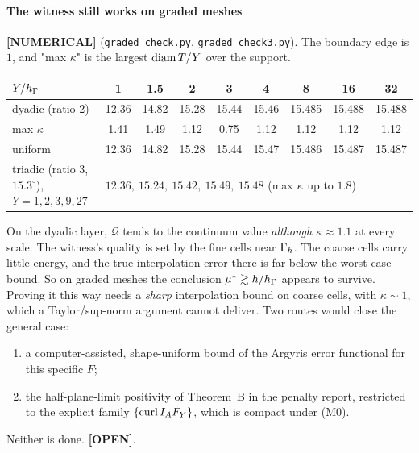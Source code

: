 \documentclass[11pt]{article}
\theoremstyle{remark}\newtheorem{remark}[theorem]{Remark}
\newcommand{\lab}[1]{\textbf{[#1]}}
\begin{document}
\paragraph{The witness still works on graded meshes} \lab{NUMERICAL} (\texttt{graded\_check.py},
\texttt{graded\_check3.py}). The boundary edge is $1$, and "max $\kappa$" is the largest $\operatorname{diam} T/Y$ over the support.
\begin{center}\small\begin{tabular}{lcccccccc}
\toprule
$Y/h_\Gamma$ & 1 & 1.5 & 2 & 3 & 4 & 8 & 16 & 32\\
\midrule
dyadic (ratio 2) & 12.36 & 14.82 & 15.28 & 15.44 & 15.46 & 15.485 & 15.488 & 15.488\\
\quad max $\kappa$ & 1.41 & 1.49 & 1.12 & 0.75 & 1.12 & 1.12 & 1.12 & 1.12\\
uniform & 12.36 & 14.82 & 15.28 & 15.44 & 15.47 & 15.486 & 15.487 & 15.487\\
\midrule
triadic (ratio 3, $15.3^\circ$), $Y=1,2,3,9,27$ & \multicolumn{8}{l}{$12.36,\ 15.24,\ 15.42,\ 15.49,\ 15.48$ (max $\kappa$ up to $1.8$)}\\
\bottomrule
\end{tabular}\end{center}
On the dyadic layer, $\mathcal Q$ tends to the continuum value \emph{although} $\kappa\approx1.1$ at every scale. The
witness's quality is set by the fine cells near $\Gamma_h$. The coarse cells carry little energy, and the true interpolation error
there is far below the worst-case bound. So on graded meshes the conclusion $\mu^\ast\gtrsim h/h_\Gamma$ appears to survive.
Proving it this way needs a \emph{sharp} interpolation bound on coarse cells, with $\kappa\sim1$, which a Taylor/sup-norm
argument cannot deliver. Two routes would close the general case:
\begin{enumerate}[label=(\roman*)]
\item a computer-assisted, shape-uniform bound of the Argyris error functional for this specific $F$;
\item the half-plane-limit positivity of Theorem~B in the penalty report, restricted to the explicit family
$\{\operatorname{curl} I_AF_Y\}$, which is compact under (M0).
\end{enumerate}
Neither is done. \lab{OPEN}.
\end{document}
